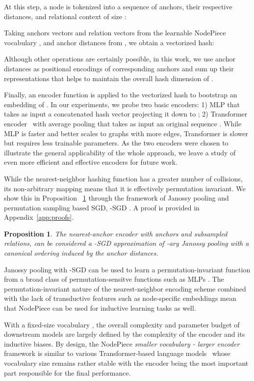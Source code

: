 \documentclass{article} \usepackage{iclr2022_conference,times}
\newtheorem{proposition}{Proposition}
\begin{document}
At this step, a node  is tokenized into a sequence of  anchors, their  respective distances, and relational context of size :


Taking anchors vectors  and relation vectors  from the learnable NodePiece vocabulary , and anchor distances  from , we obtain a vectorized hash:


Although other operations are certainly possible, in this work, we use anchor distances as positional encodings of corresponding anchors and sum up their representations that helps to maintain the overall hash dimension of .

Finally, an encoder function  is applied to the vectorized hash to bootstrap an embedding of .
In our experiments, we probe two basic encoders: 1) MLP that takes as input a concatenated hash vector  projecting it down to ; 2) Transformer encoder~\citep{DBLP:conf/nips/VaswaniSPUJGKP17} with average pooling that takes as input an original sequence .
While MLP is faster and better scales to graphs with more edges,  Transformer is slower but requires less trainable parameters. 
As the two encoders were chosen to illustrate the general applicability of the whole approach, we leave a study of even more efficient and effective encoders for future work. 

While the nearest-neighbor hashing function has a greater number of collisions, its non-arbitrary mapping means that it is effectively permutation invariant. 
We show this in Proposition ~\ref{thm:main} through the framework of Janossy pooling and permutation sampling based SGD, -SGD  \citep{murphy2019janossy}. A proof is provided in Appendix~\ref{app:proofs}.

\begin{proposition}\label{thm:main}
The nearest-anchor encoder with  anchors and  subsampled relations, can be considered a -SGD approximation of -ary Janossy pooling with a canonical ordering induced by the anchor distances.
\end{proposition}

Janossy pooling with -SGD can be used to learn a permutation-invariant function from a broad class of permutation-sensitve functions such as MLPs \citep{murphy2019janossy}. The permutation-invariant nature of the nearest-neighbor encoding scheme combined with the lack of transductive features such as node-specific embeddings mean that NodePiece can be used for inductive learning tasks as well. 

With a fixed-size vocabulary , the overall complexity and parameter budget of downstream models are largely defined by the complexity of the encoder and its inductive biases. 
By design, the NodePiece \emph{smaller vocabulary - larger encoder} framework is similar to various Transformer-based language models~\citep{qiu2020pre} whose vocabulary size remains rather stable with the encoder being the most important part responsible for the final performance.
\end{document}
